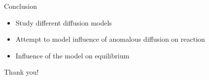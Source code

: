 \documentclass{beamer}
\begin{document}
\begin{frame}{Conclusion}

\begin{itemize}
\itemsep2em
\item Study different diffusion models
\item Attempt to model influence of anomalous diffusion on reaction
\item Influence of the model on equilibrium
\end{itemize}
\end{frame}

\begin{frame}
\begin{center}
\Huge \color{blue} Thank you!
\end{center}
\end{frame}
\end{document}
